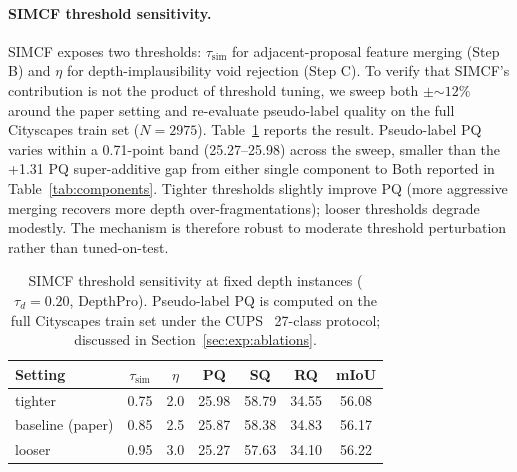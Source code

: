 \documentclass{article}
\begin{document}
\paragraph{SIMCF threshold sensitivity.}
SIMCF exposes two thresholds: $\tau_\text{sim}$ for adjacent-proposal feature merging (Step B) and $\eta$ for depth-implausibility void rejection (Step C). To verify that SIMCF's contribution is not the product of threshold tuning, we sweep both $\pm$$\sim$$12\%$ around the paper setting and re-evaluate pseudo-label quality on the full Cityscapes train set ($N=2975$). Table~\ref{tab:simcf_sensitivity} reports the result. Pseudo-label PQ varies within a 0.71-point band (25.27--25.98) across the sweep, smaller than the +1.31 PQ super-additive gap from either single component to Both reported in Table~\ref{tab:components}. Tighter thresholds slightly improve PQ (more aggressive merging recovers more depth over-fragmentations); looser thresholds degrade modestly. The mechanism is therefore robust to moderate threshold perturbation rather than tuned-on-test.

\begin{table}[tbp]
\caption{SIMCF threshold sensitivity at fixed depth instances ($\tau_d=0.20$, DepthPro). Pseudo-label PQ is computed on the full Cityscapes train set under the CUPS~\cite{hahn2025cups} 27-class protocol; discussed in Section~\ref{sec:exp:ablations}.}
\label{tab:simcf_sensitivity}
\centering
\small
\setlength{\tabcolsep}{3pt}
\begin{tabular}{l c c c c c c}
\toprule
Setting & $\tau_\text{sim}$ & $\eta$ & PQ & SQ & RQ & mIoU \\
\midrule
tighter         & 0.75 & 2.0 & 25.98 & 58.79 & 34.55 & 56.08 \\
baseline (paper) & 0.85 & 2.5 & 25.87 & 58.38 & 34.83 & 56.17 \\
looser          & 0.95 & 3.0 & 25.27 & 57.63 & 34.10 & 56.22 \\
\bottomrule
\end{tabular}
\end{table}
\end{document}
